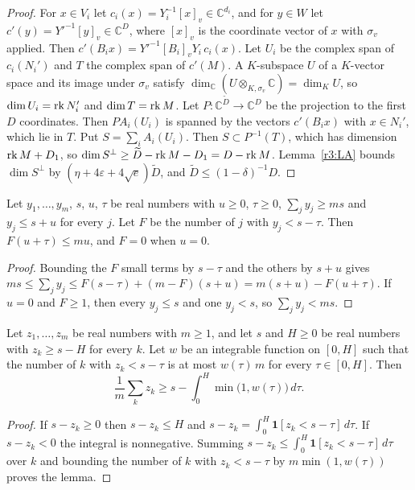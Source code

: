 \begin{proof}
For $x\in V_i$ let $c_i(x)=Y_i^{-1}[x]_v\in\mathbb C^{d_i}$, and for $y\in W$ let $c'(y)=Y'^{-1}[y]_v\in\mathbb C^D$, where $[x]_v$ is the coordinate vector of $x$ with $\sigma_v$ applied. Then $c'(B_ix)=Y'^{-1}[B_i]_vY_i\,c_i(x)$. Let $U_i$ be the complex span of $c_i(N_i')$ and $T$ the complex span of $c'(M)$. A $K$-subspace $U$ of a $K$-vector space and its image under $\sigma_v$ satisfy $\dim_{\mathbb C}(U\otimes_{K,\sigma_v}\mathbb C)=\dim_KU$, so $\dim U_i=\operatorname{rk} N_i'$ and $\dim T=\operatorname{rk} M$. Let $P\colon\mathbb C^{\widetilde D}\to\mathbb C^D$ be the projection to the first $D$ coordinates. Then $PA_i(U_i)$ is spanned by the vectors $c'(B_ix)$ with $x\in N_i'$, which lie in $T$. Put $S=\sum_iA_i(U_i)$. Then $S\subset P^{-1}(T)$, which has dimension $\operatorname{rk} M+D_1$, so $\dim S^\perp\ge\widetilde D-\operatorname{rk} M-D_1=D-\operatorname{rk} M$. Lemma~\ref{r3:LA} bounds $\dim S^\perp$ by $(\eta+4\varepsilon+4\sqrt e)\widetilde D$, and $\widetilde D\le(1-\delta)^{-1}D$.
\end{proof}

\begin{lemma}\label{r3:markov}
Let $y_1,\dots,y_m$, $s$, $u$, $\tau$ be real numbers with $u\ge0$, $\tau\ge0$, $\sum_jy_j\ge ms$ and $y_j\le s+u$ for every $j$. Let $F$ be the number of $j$ with $y_j<s-\tau$. Then $F(u+\tau)\le mu$, and $F=0$ when $u=0$.
\end{lemma}

\begin{proof}
Bounding the $F$ small terms by $s-\tau$ and the others by $s+u$ gives $ms\le\sum_jy_j\le F(s-\tau)+(m-F)(s+u)=m(s+u)-F(u+\tau)$. If $u=0$ and $F\ge1$, then every $y_j\le s$ and one $y_j<s$, so $\sum_jy_j<ms$.
\end{proof}

\begin{lemma}\label{r3:cake}
Let $z_1,\dots,z_m$ be real numbers with $m\ge1$, and let $s$ and $H\ge0$ be real numbers with $z_k\ge s-H$ for every $k$. Let $w$ be an integrable function on $[0,H]$ such that the number of $k$ with $z_k<s-\tau$ is at most $w(\tau)\,m$ for every $\tau\in[0,H]$. Then
\[
\frac1m\sum_kz_k\ge s-\int_0^H\min\big(1,w(\tau)\big)\,d\tau .
\]
\end{lemma}

\begin{proof}
If $s-z_k\ge0$ then $s-z_k\le H$ and $s-z_k=\int_0^H\mathbf 1[z_k<s-\tau]\,d\tau$. If $s-z_k<0$ the integral is nonnegative. Summing $s-z_k\le\int_0^H\mathbf 1[z_k<s-\tau]\,d\tau$ over $k$ and bounding the number of $k$ with $z_k<s-\tau$ by $m\min(1,w(\tau))$ proves the lemma.
\end{proof}

